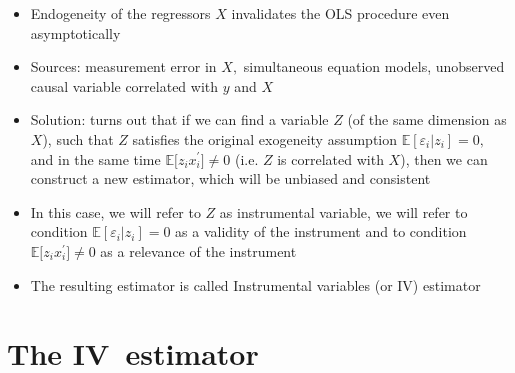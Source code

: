 \documentclass[notes=show]{beamer}
\begin{document}
\begin{frame}%


\begin{itemize}
\item Endogeneity of the regressors $X$ invalidates the OLS procedure even
asymptotically

\item Sources: measurement error in $X,$ simultaneous equation models,
unobserved causal variable correlated with $y$ and $X$

\item Solution: turns out that if we can find a variable $Z$ (of the same
dimension as $X$), such that $Z$ satisfies the original exogeneity
assumption $\mathbb{E}[\varepsilon _{i}|z_{i}]=0,$ and in the same time $%
\mathbb{E[}z_{i}x_{i}^{\prime }]\neq 0$ (i.e. $Z$ is correlated with $X$),
then we can construct a new estimator, which will be unbiased and consistent

\item In this case, we will refer to $Z$ as instrumental variable, we will
refer to condition $\mathbb{E}[\varepsilon _{i}|z_{i}]=0$ as a validity of
the instrument and to condition $\mathbb{E[}z_{i}x_{i}^{\prime }]\neq 0$ as
a relevance of the instrument

\item The resulting estimator is called Instrumental variables (or IV)
estimator
\end{itemize}

\end{frame}%

\section{The IV\ estimator}
\end{document}
